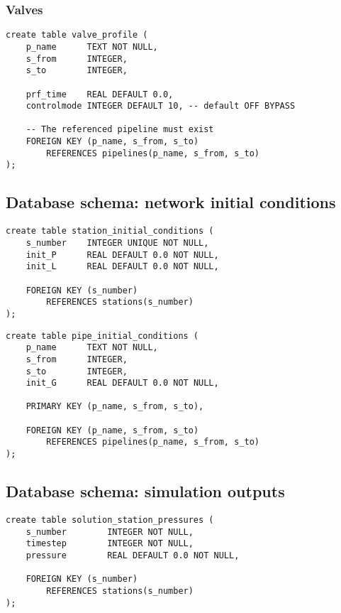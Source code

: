 \documentclass[10pt]{article}
\begin{document}
\subsubsection{Valves}
\begin{verbatim}
create table valve_profile (
    p_name      TEXT NOT NULL,
    s_from      INTEGER,
    s_to        INTEGER,

    prf_time    REAL DEFAULT 0.0,
    controlmode INTEGER DEFAULT 10, -- default OFF BYPASS

    -- The referenced pipeline must exist
    FOREIGN KEY (p_name, s_from, s_to)
        REFERENCES pipelines(p_name, s_from, s_to)
);
\end{verbatim}

\subsection{Database schema: network initial conditions}

\begin{verbatim}
create table station_initial_conditions (
    s_number    INTEGER UNIQUE NOT NULL,
    init_P      REAL DEFAULT 0.0 NOT NULL,
    init_L      REAL DEFAULT 0.0 NOT NULL,

    FOREIGN KEY (s_number)
        REFERENCES stations(s_number)
);
\end{verbatim}

\begin{verbatim}
create table pipe_initial_conditions (
    p_name      TEXT NOT NULL,
    s_from      INTEGER,
    s_to        INTEGER,
    init_G      REAL DEFAULT 0.0 NOT NULL,
    
    PRIMARY KEY (p_name, s_from, s_to),

    FOREIGN KEY (p_name, s_from, s_to)
        REFERENCES pipelines(p_name, s_from, s_to)
);
\end{verbatim}

\subsection{Database schema: simulation outputs}

\begin{verbatim}
create table solution_station_pressures (
    s_number        INTEGER NOT NULL,
    timestep        INTEGER NOT NULL,
    pressure        REAL DEFAULT 0.0 NOT NULL,
    
    FOREIGN KEY (s_number)
        REFERENCES stations(s_number)
);
\end{verbatim}
\end{document}
